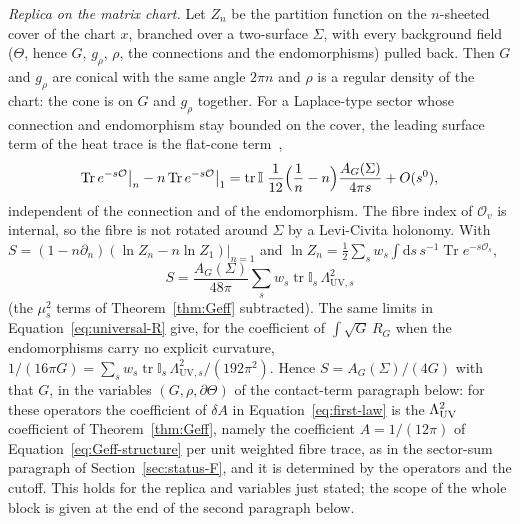 \emph{Replica on the matrix chart.} Let \(Z_n\) be the partition function on the \(n\)-sheeted cover of the chart \(x\), branched over a two-surface \(\Sigma\), with every background field (\(\Theta\), hence \(G\), \(g_\rho\), \(\rho\), the connections and the endomorphisms) pulled back. Then \(G\) and \(g_\rho\) are conical with the same angle \(2\pi n\) and \(\rho\) is a regular density of the chart: the cone is on \(G\) and \(g_\rho\) together. For a Laplace-type sector whose connection and endomorphism stay bounded on the cover, the leading surface term of the heat trace is the flat-cone term~\cite{Solodukhin2011},
\[
  \operatorname{Tr}e^{-s\mathcal O}\big|_n-n\operatorname{Tr}e^{-s\mathcal O}\big|_1
  =\operatorname{tr}\mathbb I\;\frac1{12}\Bigl(\frac1n-n\Bigr)\frac{A_G(\Sigma)}{4\pi s}+O(s^0),
\]
independent of the connection and of the endomorphism. The fibre index of \(\mathcal O_v\) is internal, so the fibre is not rotated around \(\Sigma\) by a Levi-Civita holonomy. With \(S=(1-n\partial_n)(\ln Z_n-n\ln Z_1)|_{n=1}\) and \(\ln Z_n=\tfrac12\sum_sw_s\int\mathrm{d}s\,s^{-1}\operatorname{Tr}e^{-s\mathcal O_s}\),
\[
  S=\frac{A_G(\Sigma)}{48\pi}\sum_sw_s\operatorname{tr}\mathbb I_s\,\Lambda_{\mathrm{UV},s}^2
\]
(the \(\mu_s^2\) terms of Theorem~\ref{thm:Geff} subtracted). The same limits in Equation~\eqref{eq:universal-R} give, for the coefficient of \(\int\sqrt{G}\,R_G\) when the endomorphisms carry no explicit curvature, \(1/(16\pi G)=\sum_sw_s\operatorname{tr}\mathbb I_s\,\Lambda_{\mathrm{UV},s}^2/(192\pi^2)\). Hence \(S=A_G(\Sigma)/(4G)\) with that \(G\), in the variables \((G,\rho,\partial\Theta)\) of the contact-term paragraph below: for these operators the coefficient of \(\delta A\) in Equation~\eqref{eq:first-law} is the \(\Lambda_{\mathrm{UV}}^2\) coefficient of Theorem~\ref{thm:Geff}, namely the coefficient \(A=1/(12\pi)\) of Equation~\eqref{eq:Geff-structure} per unit weighted fibre trace, as in the sector-sum paragraph of Section~\ref{sec:status-F}, and it is determined by the operators and the cutoff. This holds for the replica and variables just stated; the scope of the whole block is given at the end of the second paragraph below.

